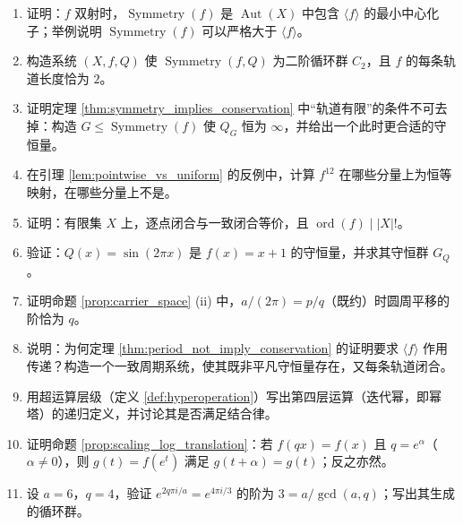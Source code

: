 \begin{enumerate}[leftmargin=3em, label=\textbf{题 \arabic*}]
    \item 证明：$f$ 双射时，$\operatorname{Symmetry}(f)$ 是 $\operatorname{Aut}(X)$ 中包含 $\langle f\rangle$ 的最小中心化子；举例说明 $\operatorname{Symmetry}(f)$ 可以严格大于 $\langle f\rangle$。
    \item 构造系统 $(X,f,Q)$ 使 $\operatorname{Symmetry}(f,Q)$ 为二阶循环群 $C_2$，且 $f$ 的每条轨道长度恰为 $2$。
    \item 证明定理 \ref{thm:symmetry_implies_conservation} 中“轨道有限”的条件不可去掉：构造 $G\le\operatorname{Symmetry}(f)$ 使 $Q_G$ 恒为 $\infty$，并给出一个此时更合适的守恒量。
    \item 在引理 \ref{lem:pointwise_vs_uniform} 的反例中，计算 $f^{12}$ 在哪些分量上为恒等映射，在哪些分量上不是。
    \item 证明：有限集 $X$ 上，逐点闭合与一致闭合等价，且 $\operatorname{ord}(f)\mid |X|!$。
    \item 验证：$Q(x)=\sin(2\pi x)$ 是 $f(x)=x+1$ 的守恒量，并求其守恒群 $G_Q$。
    \item 证明命题 \ref{prop:carrier_space} (ii) 中，$a/(2\pi)=p/q$（既约）时圆周平移的阶恰为 $q$。
    \item 说明：为何定理 \ref{thm:period_not_imply_conservation} 的证明要求 $\langle f\rangle$ 作用传递？构造一个一致周期系统，使其既非平凡守恒量存在，又每条轨道闭合。
    \item 用超运算层级（定义 \ref{def:hyperoperation}）写出第四层运算（迭代幂，即幂塔）的递归定义，并讨论其是否满足结合律。
    \item 证明命题 \ref{prop:scaling_log_translation}：若 $f(qx)=f(x)$ 且 $q=e^\alpha$（$\alpha\neq 0$），则 $g(t)=f(e^t)$ 满足 $g(t+\alpha)=g(t)$；反之亦然。
    \item 设 $a=6$，$q=4$，验证 $e^{2q\pi i/a}=e^{4\pi i/3}$ 的阶为 $3=a/\gcd(a,q)$；写出其生成的循环群。
\end{enumerate}

